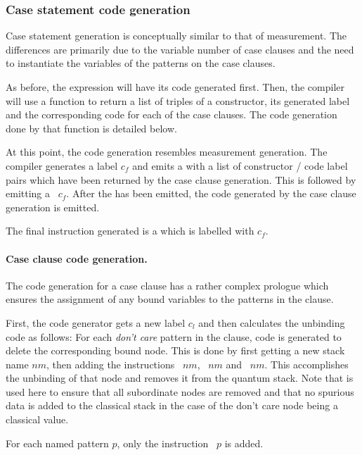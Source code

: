 \subsubsection{Case statement code generation}

Case statement generation is conceptually similar to that of
measurement. The  differences are primarily due to the variable 
number of case clauses and the need to instantiate the variables of the 
patterns on the case clauses.

As before, the expression will have its code generated first.
Then, the compiler will use a function to return a list of triples of
a constructor, its generated label and the corresponding code for
 each of the case clauses. 
The code generation done by that function is detailed below.

At this point, the code generation resembles measurement generation.
The compiler generates a label $c_f$ and emits
a  with a list of constructor / code label pairs which
have been returned by 
the case clause generation. This is followed by emitting
a ~$c_f$. 
After the  has been emitted, 
the code generated by the case clause generation is emitted.

The final instruction generated is a  which is labelled
with $c_f$.

\paragraph{Case clause code generation.} 
The code generation for a case clause has a rather complex prologue which
ensures the assignment of any bound variables to the patterns in the 
clause.

First, the code generator gets
 a new label $c_l$ and then calculates the unbinding code as follows:
For each \emph{don't care} pattern in the clause, code is 
generated to delete the corresponding bound node. 
This is done by first getting a new stack name $nm$, then
adding the instructions ~$nm$, ~$nm$ and
~$nm$. This accomplishes the unbinding of that node and
removes it from the quantum stack. Note that  is used here
to ensure that all subordinate nodes are removed and that no spurious data
is added to the classical stack in the case of the don't care node being a
classical value.

For each  named pattern $p$, only the
instruction ~$p$ is added.

